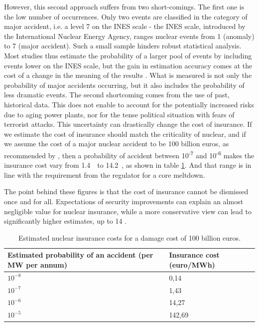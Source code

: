 However, this second approach suffers from two short-comings. The first one is the low number of occurrences. Only two events are classified in the category of major accident, i.e. a level 7 on the INES scale - the INES scale, introduced by the International Nuclear Energy Agency, ranges nuclear events from 1 (anomaly) to 7 (major accident). Such a small sample hinders robust statistical analysis. Most studies thus estimate the probability of a larger pool of events by including events lower on the INES scale, but the gain in estimation accuracy comes at the cost of a change in the meaning of the results \citep{Rangel2014}. What is measured is not only the probability of major accidents occurring, but it also includes the probability of less dramatic events. 
The second shortcoming comes from the use of past, historical data. This does not enable to account for the potentially increased risks due to aging power plants, nor for the tense political situation with fears of terrorist attacks. 
This uncertainty can drastically change the cost of insurance. If we estimate the cost of insurance should match the criticality of nuclear, and if we assume the cost of a major nuclear accident to be 100 billion euros, as recommended by \citet{CourdesComptes2012}, then a probability of accident between 10\textsuperscript{-7} and 10\textsuperscript{-6} makes the insurance cost vary from 1.4~\emwh\ to 14.2~\emwh, as shown in table \ref{tab:insurance}. 
And that range is in line with the requirement from the regulator for a core meltdown.

The point behind these figures is that the cost of insurance cannot be dismissed once and for all. Expectations of security improvements can explain an almost negligible value for nuclear insurance, while a more conservative view can lead to significantly higher estimates, up to 14 \emwh. 

\begin{table}
	\centering
	\caption{Estimated nuclear insurance costs for a damage cost of 100 billion euros.}
	\label{tab:insurance}
	\begin{tabular}{p{2cm}p{6cm}}
		\toprule
		Estimated probability of an accident \newline (per MW per annum) & Insurance cost (euro/MWh) \\
		\midrule
		$10^{-8}$  & 0,14 \\
		$10^{-7}$  & 1,43 \\
		$10^{-6}$  & 14,27 \\
		$10^{-5}$  & 142,69 \\
		\bottomrule
	\end{tabular}  
\end{table}


